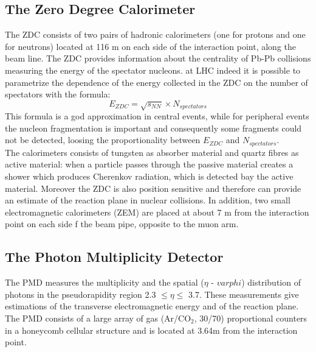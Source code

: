 \subsection*{The Zero Degree Calorimeter}
The ZDC consists of two pairs of hadronic calorimeters (one for protons and one for neutrons) located at 116 m on each side of the interaction point, along the beam line. The ZDC provides information about the centrality of Pb-Pb collisions measuring the energy of the spectator nucleons. at LHC indeed it is possible to parametrize the dependence of the energy collected in the ZDC on the number of spectators with the formula:
\begin{equation*}
 E_{ZDC} = \sqrt{s_{NN}} \times N_{spectators}
\end{equation*}
This formula is a god approximation in central events, while for peripheral events the nucleon fragmentation is important and consequently some fragments could not be detected, loosing the proportionality between $E_{ZDC}$ and $N_{spectators}$.\\
The calorimeters consists of tungsten as absorber material and quartz fibres as active material: when a particle passes through the passive material creates a shower which produces Cherenkov radiation, which is detected bay the active material. Moreover the ZDC is also position sensitive and therefore can provide an estimate of the reaction plane in nuclear collisions.
In addition, two small electromagnetic calorimeters (ZEM) are placed at about 7 m from the interaction point on each side f the beam pipe, opposite to the muon arm.
\subsection*{The Photon Multiplicity Detector}
The PMD measures the multiplicity and the spatial ($\eta$ - $varphi$) distribution of photons in the pseudorapidity region 2.3 $\leq \eta \leq$ 3.7. These measurements give estimations of the transverse electromagnetic energy and of the reaction plane. The PMD consists of a large array of gas (Ar/CO$_2$, 30/70) proportional counters in a honeycomb cellular structure and is located at 3.64m from the interaction point.
